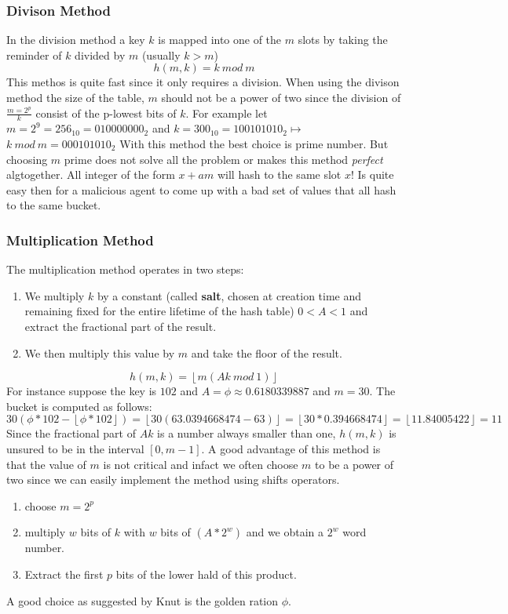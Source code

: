 \subsubsection{Divison Method}
In the division method a key $k$ is mapped into one of the $m$ slots by taking the reminder of $k$ divided by $m$ (usually $ k> m$)
\[
h(m,k) = k \:mod\: m
\]
This methos is quite fast since it only requires a division. When using the divison method the size of the table, $m$ should not be a power of two since the division of $\frac{m=2^p}{k}$ consist of the p-lowest bits of $k$. For example let $m = 2^9 = 256_{10} = 010000000_2$ and $ k=300_{10}  = 100101010_2 \mapsto $ $k \: mod \:m = 000101010_2$ 
With this method the best choice is  prime number. But choosing $m$ prime does not solve all the problem or makes this method \textit{perfect} algtogether. All integer of the form $x+am$ will hash to the same slot $x$! Is quite easy then for a malicious agent to come up with a bad set of values that all hash to the same bucket.

\subsubsection{Multiplication Method}
The multiplication method operates in two steps: 
\begin{enumerate}
\item We multiply $k$ by a constant (called \textbf{salt}, chosen at creation time and remaining fixed for the entire lifetime of the hash table) $0<A<1$ and extract the fractional part of the result.
\item We then multiply this value by $m$ and take the floor of the result.
\end{enumerate}

\[
h(m,k) = \left \lfloor{m(Ak \: mod \: 1)}\right \rfloor 
\]
For instance suppose the key is $102$ and $A=\phi \approx 0.6180339887$ and $m = 30 $. The bucket is computed as follows:
\[
30 (\phi*102 - \left \lfloor \phi*102 \right \rfloor  ) =  \left \lfloor{30(63.0394668474 - 63 )}\right \rfloor = \left \lfloor{30*0.394668474}\right \rfloor  = \left \lfloor{11.84005422}\right \rfloor  = 11
\]
Since the fractional part of $Ak$ is a number always smaller than one, $h(m,k)$ is unsured to be in the interval $[0,m-1]$. A good advantage of this method is that the value of $m$ is not critical and infact we often choose $m$ to be a power of two since we can easily implement the method using shifts operators.


\begin{enumerate}
\item choose $m=2^p$
\item multiply $w$ bits of $k$ with $w$ bits of $(A *2^w)$ and we obtain a $2^w$ word number.
\item Extract the first $p$ bits of the lower hald of this product.
\end{enumerate}
A good choice as suggested by Knut is the  golden ration $\phi$.

